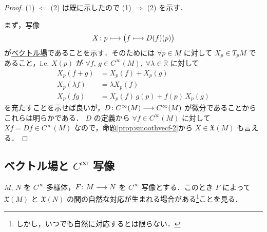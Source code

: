 \documentclass[geometry_main]{subfiles}
\begin{document}
\begin{proof}
    (1) $\Longleftarrow$ (2) は既に示したので (1) $\Longrightarrow$ (2) を示す．

    まず，写像 
    \begin{align}
        X \colon p \longmapsto \bigl(f \longmapsto D(f)(p)\bigr)
    \end{align}
    が\hyperref[def:vecf]{ベクトル場}であることを示す．そのためには $\forall p \in M$ に対して $X_p \in T_p M$ であること，i.e. $X(p)$ が $\forall f,\, g \in C^\infty(M),\; \forall \lambda \in \mathbb{R}$ に対して
    \begin{align}
        X_p(f+g) &= X_p(f) + X_p(g) \\
        X_p(\lambda f) &=\lambda X_p(f) \\
        X_p(fg) &= X_p(f)\, g(p) + f(p)\, X_p(g) 
    \end{align}
    を充たすことを示せば良いが，$D \colon C^\infty (M) \longrightarrow C^\infty (M)$ が微分であることからこれらは明らかである．
    $D$ の定義から $\forall f \in C^\infty (M)$ に対して $Xf = Df \in C^\infty(M)$ なので，命題\ref{prop:smoothvecf-2}から $X \in \mathfrak{X}(M)$ も言える．
\end{proof}

\subsection{ベクトル場と $C^\infty$ 写像}

$M,\, N$ を $C^\infty$ 多様体，$F \colon M \longrightarrow N$ を $C^\infty$ 写像とする．このとき $F$ によって $\mathfrak{X}(M)$ と $\mathfrak{X}(N)$ の間の自然な対応が生まれる場合がある\footnote{しかし，いつでも自然に対応するとは限らない．}ことを見る．
\end{document}
